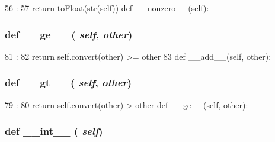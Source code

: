 \begin{DoxyCode}
56                        :
57         return toFloat(str(self))
    def __nonzero__(self):
\end{DoxyCode}
\hypertarget{classm5_1_1util_1_1smartdict_1_1Variable_a3ee81c22a31860655ba6bf83ff5a8f36}{
\subsubsection[{\_\-\_\-ge\_\-\_\-}]{\setlength{\rightskip}{0pt plus 5cm}def \_\-\_\-ge\_\-\_\- ( {\em self}, \/   {\em other})}}
\label{classm5_1_1util_1_1smartdict_1_1Variable_a3ee81c22a31860655ba6bf83ff5a8f36}



\begin{DoxyCode}
81                            :
82         return self.convert(other) >= other
83 
    def __add__(self, other):
\end{DoxyCode}
\hypertarget{classm5_1_1util_1_1smartdict_1_1Variable_a728aec3eafa75fd847ce0bf8f954efde}{
\subsubsection[{\_\-\_\-gt\_\-\_\-}]{\setlength{\rightskip}{0pt plus 5cm}def \_\-\_\-gt\_\-\_\- ( {\em self}, \/   {\em other})}}
\label{classm5_1_1util_1_1smartdict_1_1Variable_a728aec3eafa75fd847ce0bf8f954efde}



\begin{DoxyCode}
79                            :
80         return self.convert(other) > other
    def __ge__(self, other):
\end{DoxyCode}
\hypertarget{classm5_1_1util_1_1smartdict_1_1Variable_a28a958e3c802a3137bcf4b44d5cef95c}{
\subsubsection[{\_\-\_\-int\_\-\_\-}]{\setlength{\rightskip}{0pt plus 5cm}def \_\-\_\-int\_\-\_\- ( {\em self})}}
\label{classm5_1_1util_1_1smartdict_1_1Variable_a28a958e3c802a3137bcf4b44d5cef95c}



